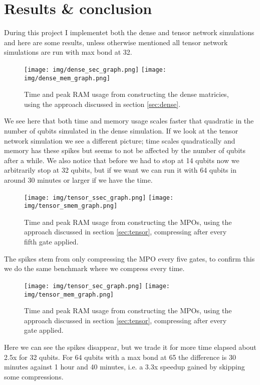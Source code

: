 \section{Results \& conclusion}\label{sec:results}
During this project I implementet both the dense and tensor network simulations and here are some results, unless otherwise mentioned all tensor network simulations are run with max bond at 32. 
\begin{figure}[H]
    \begin{center}
        \texttt{[image: img/dense\_sec\_graph.png]}
        \texttt{[image: img/dense\_mem\_graph.png]}
    \end{center}
    \caption{Time and peak RAM usage from constructing the dense matricies, using the approach discussed in section \ref{sec:dense}.}
    \label{fig:dense_perf}
\end{figure}
We see here that both time and memory usage scales faster that quadratic in the number of qubits simulated in the dense simulation. If we look at the tensor network simulation we see a different picture; time scales quadratically and memory has these spikes but seems to not be affected by the number of qubits after a while. We also notice that before we had to stop at 14 qubits now we arbitrarily stop at 32 qubits, but if we want we can run it with 64 qubits in around 30 minutes or larger if we have the time. 
\begin{figure}[H]
    \begin{center}
        \texttt{[image: img/tensor\_ssec\_graph.png]}
        \texttt{[image: img/tensor\_smem\_graph.png]}
    \end{center}
    \caption{Time and peak RAM usage from constructing the MPOs, using the approach discussed in section \ref{sec:tensor}, compressing after every fifth gate applied.}
    \label{fig:stensor_perf}
\end{figure}
The spikes stem from only compressing the MPO every five gates, to confirm this we do the same benchmark where we compress every time. 
\begin{figure}[H]
    \begin{center}
        \texttt{[image: img/tensor\_sec\_graph.png]}
        \texttt{[image: img/tensor\_mem\_graph.png]}
    \end{center}
    \caption{Time and peak RAM usage from constructing the MPOs, using the approach discussed in section \ref{sec:tensor}, compressing after every gate applied.}
    \label{fig:tensor_perf}
\end{figure}
Here we can see the spikes disappear, but we trade it for more time elapsed about 2.5x for 32 qubits. For 64 qubits with a max bond at 65 the difference is 30 minutes against 1 hour and 40 minutes, i.e. a 3.3x speedup gained by skipping some compressions. 

